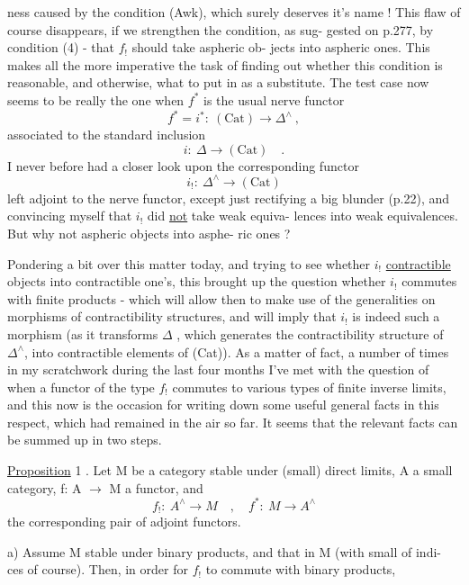 
ness caused by the condition (Awk),  which surely deserves it's name !
This flaw of course disappears,  if we strengthen the condition,  as sug-%
gested on p.277,  by condition (4)  -  that $f_!$ should take aspheric ob-%
jects into aspheric ones.  This makes all the more imperative the task of
finding out whether this condition is reasonable,  and otherwise, what to
put in as a substitute.  The test case now seems to be really the one when
$f^*$ is the usual nerve functor
\[ f^* = i^* :\ (\mathrm{Cat}) \longrightarrow \Delta^{\wedge} \ , \]
associated to the standard inclusion
\[ i :\ \Delta \longrightarrow (\mathrm{Cat}) \quad . \]
I never before had a closer look upon the corresponding functor
\[ i_! :\ \Delta^{\wedge} \longrightarrow (\mathrm{Cat}) \]
left adjoint to the nerve functor,  except just  rectifying a big
blunder (p.22),  and convincing myself that $i_!$ did \uline{not} take weak equiva-%
lences into weak equivalences.  But why not aspheric objects into asphe-%
ric ones ?

Pondering a bit over this matter today,  and trying to see whether
$i_!$   \uline{contractible} objects into contractible one's,  this brought up
the question whether $i_!$ commutes with finite products -  which will allow
then to make use of the generalities on morphisms of contractibility
structures,  and will imply that $i_!$  is indeed such a morphism (as it
transforms $\Delta$ ,  which generates the contractibility structure of $\Delta^{\wedge}$,
into contractible elements of (Cat)).  As a matter of fact,  a number of
times in my scratchwork during the last four months I've met with the
question of when a functor of the type $f_!$ commutes to various types of
finite inverse limits,  and this now is the occasion for writing down
some useful general facts in this respect,  which had remained  in the air
so far.  It seems that the relevant facts can be summed up in two steps.

\uline{Proposition} 1 .  Let M be a category stable under (small) direct limits,
A a small category,  f: A $\longrightarrow$ M a functor,  and
\[ f_! :\ A^{\wedge} \longrightarrow M \quad , \quad f^* :\ M \to A^{\wedge} \]
the corresponding pair of adjoint functors.

a)  Assume M stable under binary products,  and that  in M\hand{,}
 (with small  of indi-%
ces of course).  Then,  in order for $f_!$ to commute with binary products,

